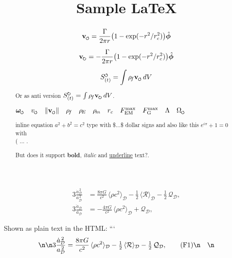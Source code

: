 \documentclass{article}
\title{Sample \LaTeX}
\newcommand{\swirlarrow}{%
    \mathchoice{\mkern-2mu\scriptstyle\boldsymbol{\circlearrowleft}}%
    {\mkern-2mu\scriptstyle\boldsymbol{\circlearrowleft}}%
    {\mkern-2mu\scriptscriptstyle\boldsymbol{\circlearrowleft}}%
    {\mkern-2mu\scriptscriptstyle\boldsymbol{\circlearrowleft}}%
}
\newcommand{\swirlarrowcw}{%
    \mathchoice{\mkern-2mu\scriptstyle\boldsymbol{\circlearrowright}}%
    {\mkern-2mu\scriptstyle\boldsymbol{\circlearrowright}}%
    {\mkern-2mu\scriptscriptstyle\boldsymbol{\circlearrowright}}%
    {\mkern-2mu\scriptscriptstyle\boldsymbol{\circlearrowright}}%
}
\newcommand{\vswirl}{\mathbf{v}_{\swirlarrow}}
\newcommand{\vswirlcw}{\mathbf{v}_{\swirlarrowcw}}
\newcommand{\SwirlClock}{S_{(t)}^{\swirlarrow}}
\newcommand{\SwirlClockcw}{S_{(t)}^{\swirlarrowcw}}
\newcommand{\omegas}{\boldsymbol{\omega}_{\swirlarrow}}  %
\newcommand{\vscore}{v_{\swirlarrow}}                    %
\newcommand{\vnorm}{\lVert \vswirl \rVert}               %
\newcommand{\rhof}{\rho_{\!f}}                           %
\newcommand{\rhoE}{\rho_{\!E}}                           %
\newcommand{\rhom}{\rho_{\!m}}                           %
\newcommand{\rc}{r_c}                                    %
\newcommand{\FmaxEM}{F_{\mathrm{EM}}^{\max}}             %
\newcommand{\FmaxG}{F_{\mathrm{G}}^{\max}}               %
\newcommand{\Lam}{\Lambda}                               %
\newcommand{\Om}{\Omega_{\swirlarrow}}                   %
\begin{document}
    \maketitle

    \begin{abstract}

        \begin{equation}
            \vswirl = \frac{\Gamma}{2\pi r}\bigl(1-\exp(-r^2/\rc^2)\bigr)\hat{\bm{\phi}}
        \end{equation}

        \[\vswirlcw = -\frac{\Gamma}{2\pi r}\bigl(1-\exp(-r^2/\rc^2)\bigr)\hat{\bm{\phi}}\]


        \begin{equation}
            \SwirlClock = \int \rhof \vswirl \, dV
        \end{equation}

        Or as anti version \(\SwirlClockcw = \int \rhof \vswirlcw \, dV\).

        $\omegas\quad \vscore\quad \vnorm\quad \rhof\quad \rhoE\quad \rhom\quad \rc\quad \FmaxEM\quad \FmaxG\quad \Lam\quad \Om$

        inline equation $a^2 + b^2 = c^2$ type with \$...\$ dollar signs
        and also like this \(e^{i\pi} + 1 = 0\) with \\( ... \).

        But does it support \textbf{bold}, \textit{italic} and \underline{underline} text?.

    \end{abstract}

    \begin{align}
        3\frac{\dot a_\mathcal{D}^{\,2}}{a_\mathcal{D}^{\,2}}
        &= \frac{8\pi G}{c^2}\,\langle \rho c^2 \rangle_\mathcal{D}
        - \tfrac{1}{2}\,\langle \mathcal{R} \rangle_\mathcal{D}
        - \tfrac{1}{2}\,\mathcal{Q}_\mathcal{D}, \tag{F1}\label{F1}\\
        3\frac{\ddot a_\mathcal{D}}{a_\mathcal{D}}
        &= -\frac{4\pi G}{c^2}\,\langle \rho c^2 \rangle_\mathcal{D}
        + \mathcal{Q}_\mathcal{D}, \tag{F2}\label{F2}
    \end{align}


    Shown as plain text in the HTML:
```
\[\n\begin{aligned}\n3\frac{\dot a_\mathcal{D}^{\,2}}{a_\mathcal{D}^{\,2}} &= \frac{8\pi G}{c^2}\,\langle \rho c^2 \rangle_\mathcal{D} - \tfrac{1}{2}\,\langle \mathcal{R} \rangle_\mathcal{D} - \tfrac{1}{2}\,\mathcal{Q}_\mathcal{D}, \tag{F1}\n\end{aligned}\n\]
\end{document}

